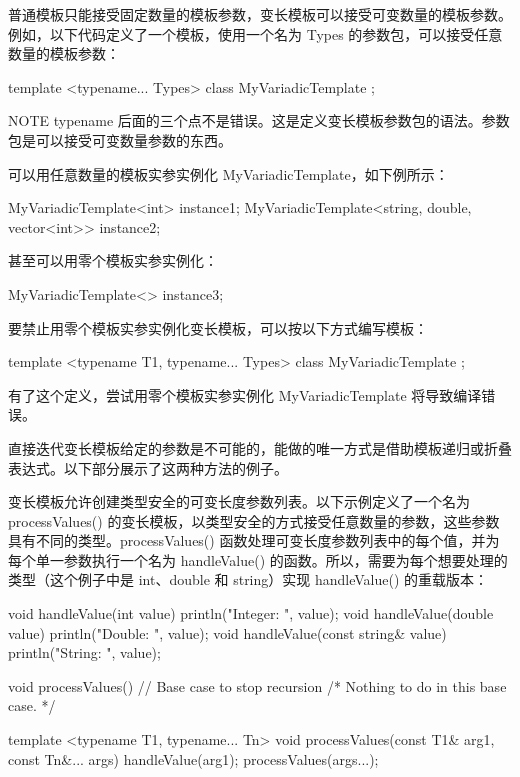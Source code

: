 
普通模板只能接受固定数量的模板参数，变长模板可以接受可变数量的模板参数。例如，以下代码定义了一个模板，使用一个名为 Types 的参数包，可以接受任意数量的模板参数：

\begin{cpp}
template <typename... Types>
class MyVariadicTemplate { };
\end{cpp}

\begin{myNotic}{NOTE}
typename 后面的三个点不是错误。这是定义变长模板参数包的语法。参数包是可以接受可变数量参数的东西。
\end{myNotic}

可以用任意数量的模板实参实例化 MyVariadicTemplate，如下例所示：

\begin{cpp}
MyVariadicTemplate<int> instance1;
MyVariadicTemplate<string, double, vector<int>> instance2;
\end{cpp}

甚至可以用零个模板实参实例化：

\begin{cpp}
MyVariadicTemplate<> instance3;
\end{cpp}

要禁止用零个模板实参实例化变长模板，可以按以下方式编写模板：

\begin{cpp}
template <typename T1, typename... Types>
class MyVariadicTemplate { };
\end{cpp}

有了这个定义，尝试用零个模板实参实例化 MyVariadicTemplate 将导致编译错误。

直接迭代变长模板给定的参数是不可能的，能做的唯一方式是借助模板递归或折叠表达式。以下部分展示了这两种方法的例子。


变长模板允许创建类型安全的可变长度参数列表。以下示例定义了一个名为 processValues() 的变长模板，以类型安全的方式接受任意数量的参数，这些参数具有不同的类型。processValues() 函数处理可变长度参数列表中的每个值，并为每个单一参数执行一个名为 handleValue() 的函数。所以，需要为每个想要处理的类型（这个例子中是 int、double 和 string）实现 handleValue() 的重载版本：

\begin{cpp}
void handleValue(int value) { println("Integer: {}", value); }
void handleValue(double value) { println("Double: {}", value); }
void handleValue(const string& value) { println("String: {}", value); }

void processValues() // Base case to stop recursion
{ /* Nothing to do in this base case. */ }

template <typename T1, typename... Tn>
void processValues(const T1& arg1, const Tn&... args)
{
    handleValue(arg1);
    processValues(args...);
}
\end{cpp}

